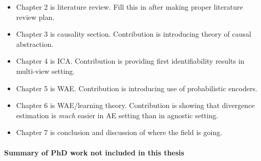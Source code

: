 \begin{itemize}
\item Chapter 2 is literature review. Fill this in after making proper literature review plan.
\item Chapter 3 is causality section. Contribution is introducing theory of causal abstraction.
\item Chapter 4 is ICA. Contribution is providing first identifiability results in multi-view setting.
\item Chapter 5 is WAE. Contribution is introducing use of probabilistic encoders.
\item Chapter 6 is WAE/learning theory. Contribution is showing that divergence estimation is \emph{much} easier in AE setting than in agnostic setting.
\item Chapter 7 is conclusion and discussion of where the field is going.
\end{itemize}

\paragraph{Summary of PhD work not included in this thesis}





















